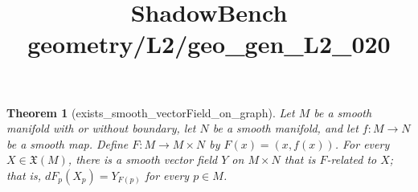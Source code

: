 \documentclass{article}
\title{ShadowBench geometry/L2/geo\_gen\_L2\_020}
\newtheorem{theorem}{Theorem}
\begin{document}
\maketitle

\begin{theorem}[exists_smooth_vectorField_on_graph]
Let $M$ be a smooth manifold with or without boundary, let $N$ be a smooth manifold, and let $f: M \to N$ be a smooth map. Define $F: M \to M \times N$ by $F(x) = (x, f(x))$. For every $X \in \mathfrak{X}(M)$, there is a smooth vector field $Y$ on $M \times N$ that is $F$-related to $X$; that is, $dF_p(X_p) = Y_{F(p)}$ for every $p \in M$.
\end{theorem}
\end{document}
